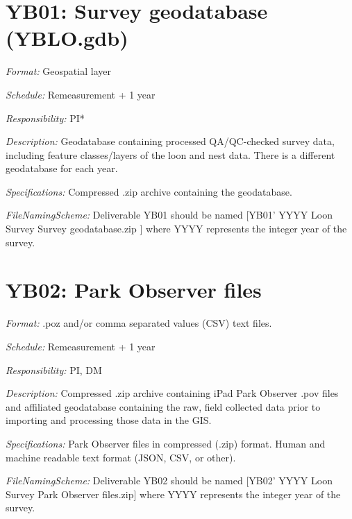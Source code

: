 \documentclass[
  letterpaper,
  DIV=11,
  numbers=noendperiod]{scrreprt}
\begin{document}

\chapter*{YB01: Survey geodatabase
(YBLO.gdb)}\label{yb01-survey-geodatabase-yblo.gdb}


\emph{Format:} Geospatial layer

\emph{Schedule:} Remeasurement + 1 year

\emph{Responsibility:} PI*

\emph{Description:} Geodatabase containing processed QA/QC-checked
survey data, including feature classes/layers of the loon and nest data.
There is a different geodatabase for each year.

\emph{Specifications:} Compressed .zip archive containing the
geodatabase.

\emph{FileNamingScheme:} Deliverable YB01 should be named {[}YB01' YYYY
Loon Survey Survey geodatabase.zip {]} where YYYY represents the integer
year of the survey.


\chapter*{YB02: Park Observer files}\label{yb02-park-observer-files}


\emph{Format:} .poz and/or comma separated values (CSV) text files.

\emph{Schedule:} Remeasurement + 1 year

\emph{Responsibility:} PI, DM

\emph{Description:} Compressed .zip archive containing iPad Park
Observer .pov files and affiliated geodatabase containing the raw, field
collected data prior to importing and processing those data in the GIS.

\emph{Specifications:} Park Observer files in compressed (.zip) format.
Human and machine readable text format (JSON, CSV, or other).

\emph{FileNamingScheme:} Deliverable YB02 should be named {[}YB02' YYYY
Loon Survey Park Observer files.zip{]} where YYYY represents the integer
year of the survey.
\end{document}
